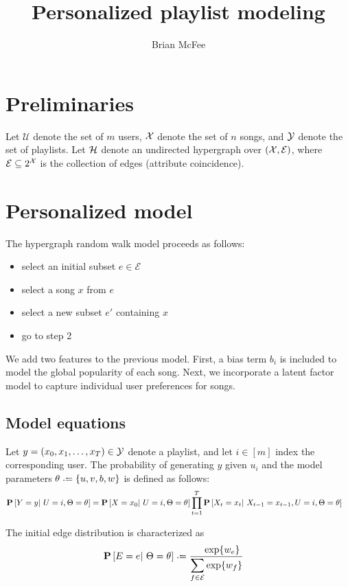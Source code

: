 \documentclass{article}
\title{Personalized playlist modeling}
\author{Brian McFee}
\def\U{\ensuremath{\mathcal{U}}}
\begin{document}
\maketitle

\section{Preliminaries}

Let $\U$ denote the set of $m$ users, $\mathcal{X}$ denote the set of $n$ songs, and $\mathcal{Y}$ denote the set of playlists.
Let $\mathcal{H}$ denote an undirected hypergraph over $(\mathcal{X}, \mathcal{E})$, where $\mathcal{E} \subseteq 2^{\mathcal{X}}$ is the
collection of edges (attribute coincidence).

\section{Personalized model}

The hypergraph random walk model proceeds as follows:
\begin{itemize}
\item select an initial subset $e \in \mathcal{E}$
\item select a song $x$ from $e$
\item select a new subset $e'$ containing $x$
\item go to step 2
\end{itemize}

We add two features to the previous model.  First, a bias term $b_i$ is included to model the global popularity of each
song.  Next, we incorporate a latent factor model to capture individual user preferences for songs.

\subsection{Model equations}

Let $y = (x_0, x_1, \dots, x_T) \in \mathcal{Y}$ denote a playlist, and let $i \in [m]$ index the corresponding user.
The probability of generating $y$ given $u_i$ and the model parameters $\theta \defeq \{u, v, b, w\}$ is defined as follows:
\begin{align*}
\mathbf{P}\left[Y = y |~ U = i, \Theta = \theta \right] &= \mathbf{P}\left[X = x_0 |~ U = i, \Theta = \theta\right]
\prod_{t=1}^{T} \mathbf{P}\left[X_t = x_t |~ X_{t-1}=x_{t-1}, U=i, \Theta=\theta \right]
\end{align*}

The initial edge distribution is characterized as
\begin{align*}
\P\left[E = e \given \Theta = \theta\right] & \defeq \frac{\phantom\sum \exp\{w_e\}}{\displaystyle\sum_{f\in \mathcal{E}} \exp\{w_f\}}
\end{align*}
\end{document}
